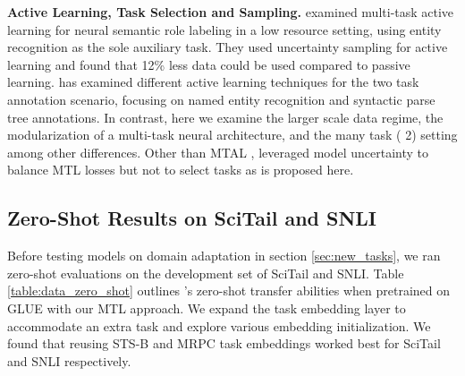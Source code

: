 \documentclass{article} \usepackage{iclr2021_conference,times}
\begin{document}
\textbf{Active Learning, Task Selection and Sampling.}
\citet{ikhwantri2018multi} examined multi-task active learning for neural semantic role labeling in a low resource setting, using entity recognition as the sole auxiliary task. They used uncertainty sampling for active learning and found that 12\% less data could be used compared to passive learning. 
\citet{reichart2008multi} has examined different active learning techniques for the two task annotation scenario, focusing on named entity recognition and syntactic parse tree annotations. 
In contrast, here we examine the larger scale data regime, the modularization of a multi-task neural architecture, and the many task ( 2) setting among other differences. Other than MTAL \citep{reichart2008multi,ikhwantri2018multi}, \cite{DBLP:journals/corr/KendallGC17} leveraged model uncertainty to balance MTL losses but not to select tasks as is proposed here.










\subsection{Zero-Shot Results on SciTail and SNLI}
\label{append:newtask_embed_choice}
Before testing models on domain adaptation in section \ref{sec:new_tasks},  we ran zero-shot evaluations on the development set of SciTail and SNLI. Table \ref{table:data_zero_shot} outlines 's zero-shot transfer abilities when  pretrained on GLUE with our MTL approach. We expand the task embedding layer to accommodate an extra task and explore various embedding initialization. We found that reusing STS-B and MRPC task embeddings worked best for SciTail and SNLI respectively.
\end{document}

